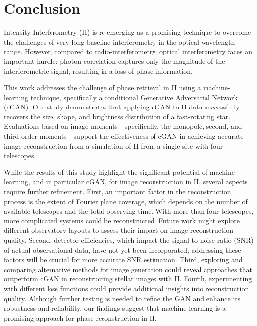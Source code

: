 \section{Conclusion}

Intensity Interferometry (II) is re-emerging as a promising technique to overcome the challenges of very long baseline interferometry in the optical wavelength range.  However, compared to radio-interferometry, optical interferometry faces an important hurdle: photon correlation captures only the magnitude of the interferometric signal, resulting in a loss of phase information.

This work addresses the challenge of phase retrieval in II using a machine-learning technique, specifically a conditional Generative Adversarial Network (cGAN). Our study demonstrates that applying cGAN to II data successfully recovers the size, shape, and brightness distribution of a fast-rotating star. Evaluations based on image moments—specifically, the monopole, second, and third-order moments—support the effectiveness of cGAN in achieving accurate image reconstruction from a simulation of II from a single site with four telescopes.  

While the results of this study highlight the significant potential of machine learning, and in particular cGAN, for image reconstruction in II, several aspects require further refinement. First, an important factor in the reconstruction process is the extent of Fourier plane coverage, which depends on the number of available telescopes and the total observing time. With more than four telescopes, more complicated systems could be reconstructed. Future work might explore different observatory layouts to assess their impact on image reconstruction quality.  Second, detector efficiencies, which impact the signal-to-noise ratio (SNR) of actual observational data, have not yet been incorporated; addressing these factors will be crucial for more accurate SNR estimation.  Third, exploring and comparing alternative methods for image generation could reveal approaches that outperform cGAN in reconstructing stellar images with II. Fourth, experimenting with different loss functions could provide additional insights into reconstruction quality. Although further testing is needed to refine the GAN and enhance its robustness and reliability, our findings suggest that machine learning is a promising approach for phase reconstruction in II.
